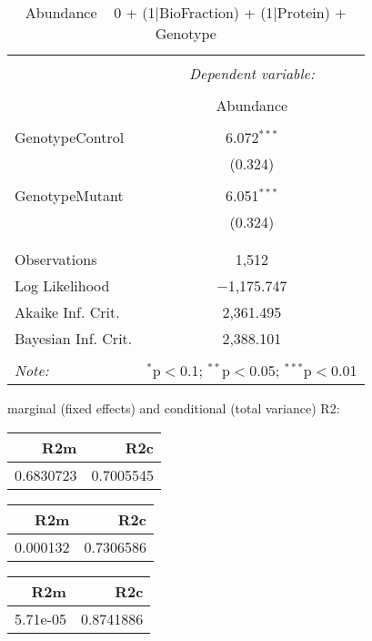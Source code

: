 \documentclass[11pt]{report}
\begin{document}
\begin{table}[!htbp] \centering 
  \caption{Abundance ~ 0 + (1|BioFraction) + (1|Protein) + Genotype} 
  \label{} 
\begin{tabular}{@{\extracolsep{5pt}}lc} 
\\[-1.8ex]\hline 
\hline \\[-1.8ex] 
 & \multicolumn{1}{c}{\textit{Dependent variable:}} \\ 
\cline{2-2} 
\\[-1.8ex] & Abundance \\ 
\hline \\[-1.8ex] 
 GenotypeControl & 6.072$^{***}$ \\ 
  & (0.324) \\ 
  & \\ 
 GenotypeMutant & 6.051$^{***}$ \\ 
  & (0.324) \\ 
  & \\ 
\hline \\[-1.8ex] 
Observations & 1,512 \\ 
Log Likelihood & $-$1,175.747 \\ 
Akaike Inf. Crit. & 2,361.495 \\ 
Bayesian Inf. Crit. & 2,388.101 \\ 
\hline 
\hline \\[-1.8ex] 
\textit{Note:}  & \multicolumn{1}{r}{$^{*}$p$<$0.1; $^{**}$p$<$0.05; $^{***}$p$<$0.01} \\ 
\end{tabular} 
\end{table} 
marginal (fixed effects) and conditional (total variance) R2:

\begin{tabular}{r|r}
\hline
R2m & R2c\\
\hline
0.6830723 & 0.7005545\\
\hline
\end{tabular}

\begin{tabular}{r|r}
\hline
R2m & R2c\\
\hline
0.000132 & 0.7306586\\
\hline
\end{tabular}

\begin{tabular}{r|r}
\hline
R2m & R2c\\
\hline
5.71e-05 & 0.8741886\\
\hline
\end{tabular}
\end{document}
